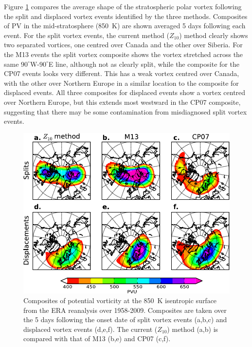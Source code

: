 Figure \ref{fig:pv_composites_m13_cp07} compares the average shape of the
stratospheric polar vortex following the split and displaced vortex events
identified by the three methods. Composites of PV in the mid-stratosphere
(850~K) are shown averaged 5 days following each event. For the split vortex
events, the current method ($Z_{10}$) method clearly shows two separated
vortices, one centred over Canada and the other over Siberia. For the M13 events
the split vortex composite shows the vortex stretched across the same
$90^{\circ}$W-$90^{\circ}$E line, although not as clearly split, while the
composite for the CP07 events looks very different. This has a weak vortex
centred over Canada, with the other over Northern Europe in a similar location
to the composite for displaced events. All three composites for displaced events
show a vortex centred over Northern Europe, but this extends most westward in
the CP07 composite, suggesting that there may be some contamination from
misdiagnosed split vortex events.

\begin{figure}
 \centering
 \noindent\includegraphics[width=\textwidth]{figures/chapter-moments/pv_composites_colbar_crop.pdf}
 \caption[PV composites for split and displaced vortex events.]{Composites of
   potential vorticity at the 850~K isentropic surface from the ERA reanalysis
   over 1958-2009. Composites are taken over the 5 days following the onset date
   of split vortex events (a,b,c) and displaced vortex events (d,e,f). The
   current ($Z_{10}$) method (a,b) is compared with that of M13 (b,e) and CP07
   (c,f).}
 \label{fig:pv_composites_m13_cp07}
\end{figure}

